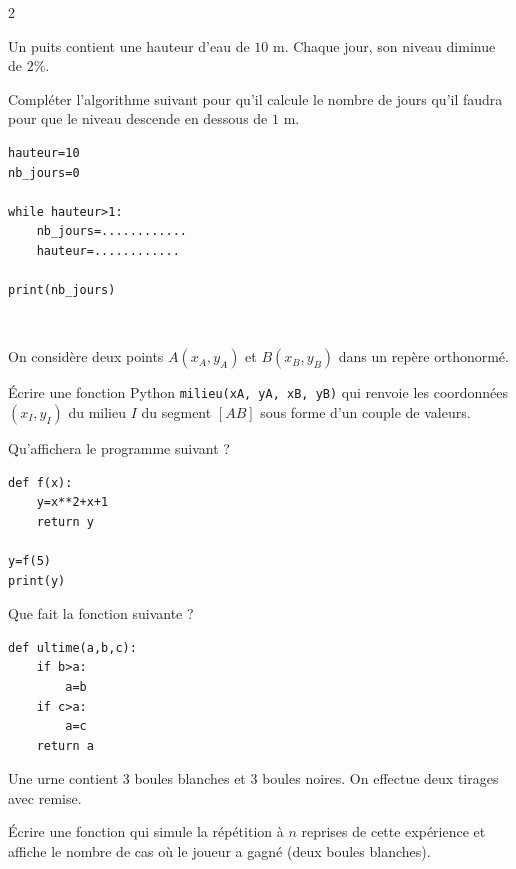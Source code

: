 {\begin{multicols}{2}
	  \begin{exo}{}
		  Un puits contient une hauteur d'eau de $10$ m. Chaque jour, son niveau diminue de $2$\%.

		  Compléter l'algorithme suivant pour qu'il calcule le nombre de jours qu'il faudra pour que le niveau descende en dessous de $1$ m.

		  \begin{lstlisting}
hauteur=10
nb_jours=0

while hauteur>1:
    nb_jours=............
    hauteur=............

print(nb_jours)
\end{lstlisting}
	  \end{exo}

	  \vfill~\columnbreak

	  \begin{exo}
		  On considère deux points $A(x_A, y_A)$ et $B(x_B, y_B)$ dans un repère orthonormé.

		  Écrire une fonction Python \lstinline|milieu(xA, yA, xB, yB)| qui renvoie les coordonnées $(x_I, y_I)$ du milieu $I$ du segment $[AB]$ sous forme d'un couple de valeurs.
	  \end{exo}

	  \begin{exo}{}
		  Qu'affichera le programme suivant ?

		  \begin{lstlisting}
def f(x):
    y=x**2+x+1
    return y

y=f(5)
print(y)
\end{lstlisting}
	  \end{exo}

	  \begin{exo}{}
		  Que fait la fonction suivante ?

		  \begin{lstlisting}
def ultime(a,b,c):
    if b>a:
        a=b
    if c>a:
        a=c
    return a
\end{lstlisting}
	  \end{exo}

	  \begin{exo}{}
		  Une urne contient $3$ boules blanches et $3$ boules noires. On effectue deux tirages avec remise.

		  Écrire une fonction qui simule la répétition à $n$ reprises de cette expérience et affiche le nombre de cas où le joueur a gagné (deux boules blanches).
	  \end{exo}


\end{multicols}}
